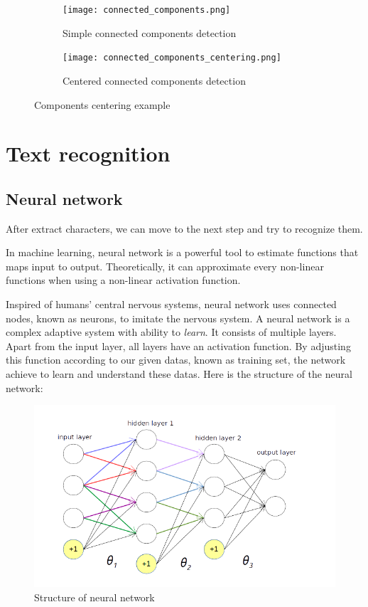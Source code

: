 \documentclass[paper=a4, french, 11pt]{scrartcl}
\begin{document}
\begin{figure}[h]
\begin{subfigure}{0.5\textwidth}
\centering
\texttt{[image: connected\_components.png]}
\caption{Simple connected components detection}
\end{subfigure}%
\begin{subfigure}{0.5\textwidth}
\centering
\texttt{[image: connected\_components\_centering.png]}
\caption{Centered connected components detection}
\end{subfigure}
\caption{Components centering example}
\label{fig:Centering}
\end{figure} 

\section{Text recognition} \mbox{} \vspace{-0.5cm}

\subsection{Neural network} \mbox{} \vspace{-0.5cm}

After extract characters, we can move to the next step and try to recognize them.

In machine learning, neural network is a powerful tool to estimate functions that maps input to output. Theoretically, it can approximate every non-linear functions when using a non-linear activation function. 

Inspired of humans' central nervous systems, neural network uses connected nodes, known as neurons, to imitate the nervous system. A neural network is a complex adaptive system with ability to \textit{learn}. It consists of multiple layers. Apart from the input layer, all layers have an activation function. By adjusting this function according to our given datas, known as training set, the network achieve to learn and understand these datas. Here is the structure of the neural network:

\begin{figure}[h]
\begin{center}
	\vspace{-1ex}
   \includegraphics[width=0.75\linewidth]{network.png}
\end{center}
\vspace{-4ex}
\caption{Structure of neural network}
\label{fig:heatmap}
\end{figure}
\end{document}

